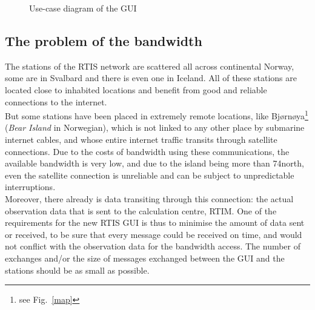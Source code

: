 \documentclass{themeensg}
\begin{document}
\begin{figure}[ht]
	\begin{center}
	\end{center}
	\caption{Use-case diagram of the GUI}
\end{figure}

\subsection{The problem of the bandwidth}

The stations of the RTIS network are scattered all across continental Norway, some are in Svalbard and there is even one in Iceland. All of these stations are located close to inhabited locations and benefit from good and reliable connections to the internet.\\

But some stations have been placed in extremely remote locations, like Bjørnøya\footnote{see Fig.~\ref{map}} (\textit{Bear Island} in Norwegian), which is not linked to any other place by submarine internet cables, and whose entire internet traffic transits through satellite connections. Due to the costs of bandwidth using these communications, the available bandwidth is very low, and due to the island being more than 74\degre north, even the satellite connection is unreliable and can be subject to unpredictable interruptions. \\

Moreover, there already is data transiting through this connection: the actual observation data that is sent to the calculation centre, RTIM. One of the requirements for the new RTIS GUI is thus to minimise the amount of data sent or received, to be sure that every message could be received on time, and would not conflict with the observation data for the bandwidth access. The number of exchanges and/or the size of messages exchanged between the GUI and the stations should be as small as possible.\\
\end{document}
